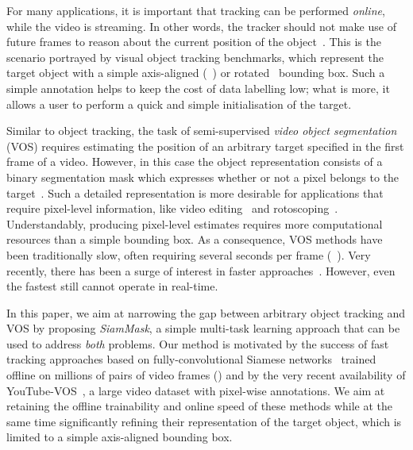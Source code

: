 \documentclass[10pt,twocolumn,letterpaper]{article}
\begin{document}
For many applications, it is important that tracking can be performed \emph{online}, while the video is streaming.
In other words, the tracker should not make use of future frames to reason about the current position of the object~\cite{kristan2016visual}.
This is the scenario portrayed by visual object tracking benchmarks, which represent the target object with a simple axis-aligned (\eg~\cite{wu2013online,valmadre2018long}) or rotated~\cite{kristan2016visual,VOT2018} bounding box.
Such a simple annotation helps to keep the cost of data labelling low; what is more, it allows a user to perform a quick and simple initialisation of the target.

Similar to object tracking, the task of semi-supervised \emph{video object segmentation} (VOS) requires estimating the position of an arbitrary target specified in the first frame of a video.
However, in this case the object representation consists of a binary segmentation mask which expresses whether or not a pixel belongs to the target~\cite{perazzi2016benchmark}.
Such a detailed representation is more desirable for applications that require pixel-level information, like video editing~\cite{perazzi2017video} and rotoscoping~\cite{miksik2017roam}.
Understandably, producing pixel-level estimates requires more computational resources than a simple bounding box.
As a consequence, VOS methods have been traditionally slow, often requiring several seconds per frame (\eg~\cite{wen2015jots,tsai2016video,perazzi2017learning,bao2018cnn}).
Very recently, there has been a surge of interest in faster approaches~\cite{Yang_2018_CVPR,marki2016bilateral,wug2018fast,cheng2018fast,chen2018blazingly,jampani2017video,hu2018videomatch}.
However, even the fastest still cannot operate in real-time.

In this paper, we aim at narrowing the gap between arbitrary object tracking and VOS by proposing \textit{SiamMask}, a simple multi-task learning approach that can be used to address \emph{both} problems.
Our method is motivated by the success of fast tracking approaches based on fully-convolutional Siamese networks~\cite{bertinetto2016fully} trained offline on millions of pairs of video frames (\eg \cite{SiamRPN,zhu2018distractor,he2018towards,yang2018learning}) and by the very recent availability of YouTube-VOS~\cite{xu2018youtube}, a large video dataset with pixel-wise annotations. 
We aim at retaining the offline trainability and online speed of these methods while at the same time significantly refining their representation of the target object, which is limited to a simple axis-aligned bounding box.
\end{document}
